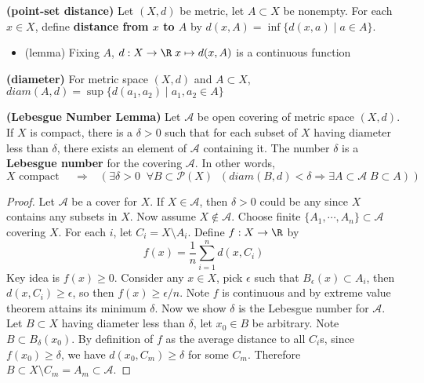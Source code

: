 \documentclass[10.5pt]{article}
\newcommand{\calA}{\mathcal{A}}
\newcommand{\calP}{\mathcal{P}}
\begin{document}
\begin{defn*}
    \textbf{(point-set distance)} Let $(X,d)$ be metric, let $A\subset X$ be nonempty. For each $x\in X$, define \textbf{distance from $x$ to $A$} by $d(x,A) = \inf \{d(x,a)\mid a\in A\}$. 
    \begin{itemize}
        \item (lemma) Fixing $A$, $d: X\to \R \; x \mapsto d(x,A)$ is a continuous function 
    \end{itemize}
\end{defn*}

\begin{defn*}
    \textbf{(diameter)} For metric space $(X,d)$ and $A\subset X$,  $diam(A,d) = \sup \{d(a_1,a_2) \mid a_1,a_2 \in A\}$
\end{defn*}

\begin{lemma*}
    \textbf{(Lebesgue Number Lemma)} Let $\calA$ be open covering of metric space $(X,d)$. If $X$ is compact, there is a $\delta > 0$ such that for each subset of $X$ having diameter less than $\delta$, there exists an element of $\calA$ containing it. The number $\delta$ is a \textbf{Lebesgue number} for the covering $\calA$. In other words, 
    \[
        X \text{ compact } \quad \Rightarrow \quad
        \Big(\;
        \exists \delta > 0 \;\; \forall B\subset \calP(X) \;\; ( diam(B,d) < \delta  \Rightarrow  \exists A\subset \calA \;  B\subset A )
        \;\Big)
    \]
    \begin{proof}
        Let $\calA$ be a cover for $X$. If $X \in \calA$, then $\delta>0$ could be any since $X$ contains any subsets in $X$. Now assume $X\not\in \calA$. Choose finite $\{A_1, \cdots, A_n\} \subset \calA$ covering $X$. For each $i$, let $C_i = X \setminus A_i$. Define $f:X\to\R$ by 
        \[
            f(x) = \frac{1}{n} \sum_{i=1}^n d(x, C_i)    
        \]
        Key idea is $f(x) \geq 0$. Consider any $x\in X$, pick $\epsilon$ such that $B_{\epsilon}(x)\subset A_i$, then $d(x,C_i) \geq \epsilon$, so then $f(x) \geq \epsilon /n$. Note $f$ is continuous and by extreme value theorem attains its minimum $\delta$. Now we show $\delta$ is the Lebesgue number for $\calA$. Let $B\subset X$ having diameter less than $\delta$, let $x_0\in B$ be arbitrary. Note $B\subset B_{\delta}(x_0)$. By definition of $f$ as the average distance to all $C_i$s, since $f(x_0) \geq \delta$, we have $d(x_0, C_m) \geq \delta$ for some $C_m$. Therefore $B\subset X \setminus C_m = A_m \subset \calA$.
    \end{proof}
\end{lemma*}
\end{document}
